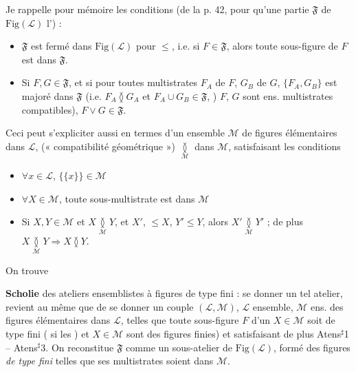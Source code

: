\documentclass[11pt,a4paper]{article}
\begin{document}
Je rappelle pour mémoire les conditions  (de la p. 42, pour qu'une partie $\mathfrak{F}$ de $\mathrm{Fig}(\mathcal{L})$ \ill{} l'\ill{}) :
\begin{itemize}
  \item[\emph{Atens*2}] $\mathfrak{F}$ est fermé dans $\mathrm{Fig}(\mathcal{L})$ pour $\leq$, i.e. si $F \in \mathfrak{F}$, alors toute sous-figure de $F$ est dans $\mathfrak{F}$.
  \item[\emph{Atens*3}] Si $F, G \in \mathfrak{F}$, et si pour  toutes multistrates $F_A$ de $F$, $G_B$ de $G$, $\lbrace F_A, G_B \rbrace$ est majoré dans $\mathfrak{F}$ (i.e. $F_A \between G_A$ et $F_A \cup G_B \in \mathfrak{F}$,   \ill{})  $F$, $G$ sont  \ill{} ens. multistrates compatibles),  $F \vee G \in \mathfrak{F}$.
\end{itemize}

Ceci peut s'expliciter  aussi en termes d'un ensemble $\mathcal{M}$ de figures  élémentaires dans $\mathcal{L}$,   (« compatibilité géométrique ») $\underset{\mathcal{M}}{\between}$ dans $\mathcal{M}$, satisfaisant les conditions
\begin{itemize}
  \item[\emph{Atens$^{\sharp}$1}] $\forall x \in \mathcal{L}$, $\lbrace \lbrace x \rbrace \rbrace \in \mathcal{M}$
  \item[\emph{Atens$^{\sharp}$2}] \struck{\ill{}} $\forall X \in \mathcal{M}$, toute sous-multistrate est dans $\mathcal{M}$
  \item[\emph{Atens$^{\sharp}$3}] Si $X, Y \in \mathcal{M}$ et $X \underset{\mathcal{M}}{\between} Y$, et $X'$,  $\leq X$, $Y' \leq Y$, alors $X' \underset{\mathcal{M}}{\between} Y'$ ; de plus $X \underset{\mathcal{M}}{\between} Y \Longrightarrow X \between Y$.
\end{itemize}

On trouve

\textbf{Scholie} des ateliers  ensemblistes à figures de type fini : se donner un tel atelier, revient au même que de se donner un \struck{\ill{}} couple $(\mathcal{L}, \mathcal{M})$, $\mathcal{L}$ \ill{} ensemble, $\mathcal{M}$ ens. des figures élémentaires dans $\mathcal{L}$, telles que toute sous-figure $F$ d'un $X \in \mathcal{M}$ soit de type fini (\ill{} si les \ill{} \ill{}) et $X \in \mathcal{M}$ sont des figures finies) et satisfaisant de plus Atens$^{\sharp}$1 -- Atens$^{\sharp}$3. On reconstitue $\mathfrak{F}$ comme un sous-atelier de $\mathrm{Fig}(\mathcal{L})$, formé des figures   \emph{de type fini} telles que ses multistrates soient dans $\mathcal{M}$.
\end{document}
